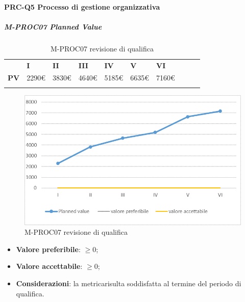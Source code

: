 \paragraph*{PRC-Q5 Processo di gestione organizzativa}
\subparagraph{M-PROC07 Planned Value} \mbox{}
\begin{longtable}[H!] {						
		>{}p{35mm}  		
		>{}p{12mm}
		>{}p{12mm}		
		>{}p{12mm}		
		>{}p{12mm}		
		>{}p{12mm}		
		>{}p{12mm}
		>{}p{12mm}
		>{}p{12mm}
		>{}p{12mm}
	}
	\rowcolor{gray!50}
	\textbf{} & \textbf{I} & \textbf{II} & \textbf{III} & \textbf{IV} & \textbf{V} & \textbf{VI} \TBstrut \\ [2mm]
	\textbf{PV} & 2290\euro & 3830\euro & 4640\euro & 5185\euro & 6635\euro & 7160\euro \TBstrut \\ [2mm]
	\rowcolor{white}
	\caption{M-PROC07 revisione di qualifica}
\end{longtable}
\begin{figure}[H] 	
	\includegraphics[width=\linewidth]{./img/grafici/RQ7.png}	
	\caption{M-PROC07 revisione di qualifica}	
\end{figure}
\begin{itemize}
	\item \textbf{Valore preferibile}: $\ge0$;
	\item \textbf{Valore accettabile}: $\ge0$;
	\item \textbf{Considerazioni}: la metrica\glosp risulta soddisfatta al termine del periodo di qualifica.
\end{itemize}

